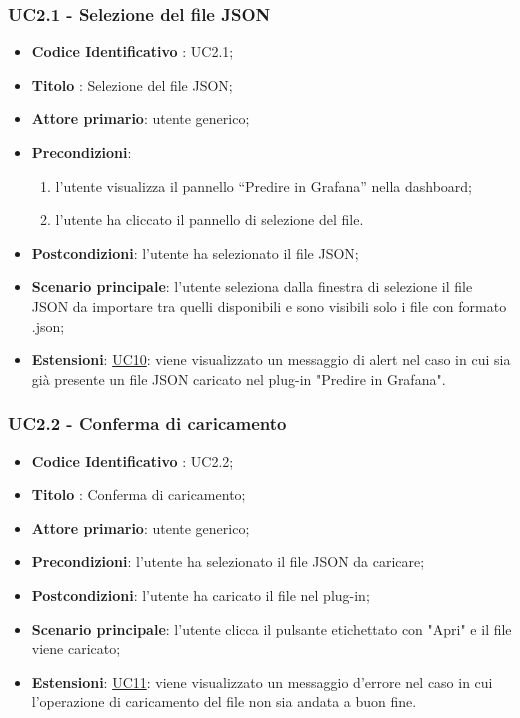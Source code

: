 		
		\label{par:UC2.1}
		\subsubsection{UC2.1 - Selezione del file JSON}
		\begin{itemize}
			\item\textbf{Codice Identificativo} : UC2.1;
			\item\textbf{Titolo} : Selezione del file JSON;
			\item\textbf{Attore primario}: utente generico;
			\item\textbf{Precondizioni}:
				\begin{enumerate}
					\item l'utente visualizza il pannello “Predire in Grafana” nella dashboard;
					\item l'utente ha cliccato il pannello di selezione del file.
					\end{enumerate}
			\item\textbf{Postcondizioni}: l'utente ha selezionato il file JSON;
			\item\textbf{Scenario principale}: l'utente seleziona dalla finestra di selezione il file JSON da importare tra quelli disponibili e sono visibili solo i file con formato .json;
			\item\textbf{Estensioni}: \hyperref[par:UC10]{UC10}: viene visualizzato un messaggio di alert nel caso in cui sia già presente un file JSON caricato nel plug-in "Predire in Grafana".
				
			\end{itemize}
		
		\label{par:UC2.2}
		\subsubsection{UC2.2 - Conferma di caricamento}
		\begin{itemize}
			\item\textbf{Codice Identificativo} : UC2.2;
			\item\textbf{Titolo} : Conferma di caricamento;
			\item\textbf{Attore primario}: utente generico;
			\item\textbf{Precondizioni}: l'utente ha selezionato il file JSON da caricare;
			\item\textbf{Postcondizioni}: l'utente ha caricato il file nel plug-in;
			\item\textbf{Scenario principale}: l'utente clicca il pulsante etichettato con "Apri" e il file viene caricato;
			\item\textbf{Estensioni}: \hyperref[par:UC11]{UC11}: viene visualizzato un messaggio d'errore nel caso in cui l'operazione di caricamento del file non sia andata a buon fine.
					
		\end{itemize}
		
